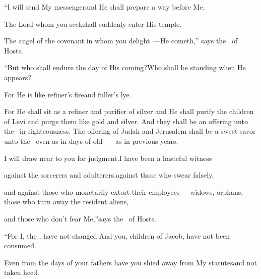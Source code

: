 
\begin{inparaenum}
  \pa {} ``I will send My messenger\pa and He shall prepare a way before Me.%
  
  \pb The Lord whom you seek\pa shall suddenly enter His temple.%
  
  \pc The angel of the covenant in whom you delight~---He cometh,'' says the \lord\ of Hosts.%
  
  \pa {} ``But who shall endure the day of His coming?\pa Who shall be standing when He appears?%
  
  \pb For He is like refiner's fire\pa and fuller's lye.%
  \smallskip%
  
  \noindent{} For He shall sit as a refiner and purifier of silver and He shall purify the children of Levi and purge them like gold and silver. And they shall be an offering unto the \lord\ in righteousness.%
   The offering of Judah and Jerusalem shall be a sweet savor unto the \lord\ even as in days of old~--- as in previous years.\smallskip%
  
  \pa {} I will draw near to you for judgment.\pa I have been a hasteful%
  witness%
  
  \pb against the sorcerers and adulterers,\pa against those who swear falsely,%
  
  \pb and against those who monetarily extort their employees~---\pa widows, orphans, those who turn away the resident aliens,%
  
  \pb and those who don't fear Me,''\pa says the \lord\ of Hosts.%
  
  \pa {} ``For I, the \lord, have not changed.\pa And you, children of Jacob, have not been consumed.%
  
  \pa {} Even from the days of your fathers have you shied away from My statutes\pa and not taken heed.%
  

\end{inparaenum}
